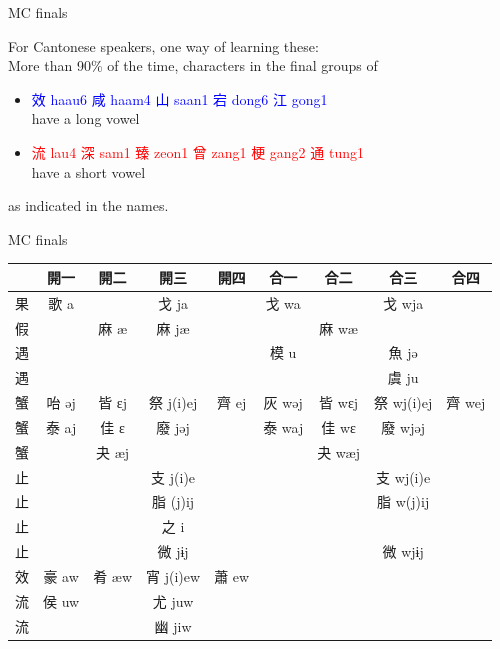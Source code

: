 \documentclass{beamer}
\begin{document}
\begin{frame}[fragile]{MC finals}

For Cantonese speakers, one way of learning these:\\
More than 90\% of the time, characters in the final groups of
        \begin{itemize}
            \item \textcolor{blue}{效 haau6 咸 haam4 山 saan1 宕 dong6 江 gong1}\\ have a long vowel
            \item \textcolor{red}{流 lau4 深 sam1 臻 zeon1 曾 zang1 梗 gang2 通 tung1}\\ have a short vowel
        \end{itemize}
as indicated in the names.\\

\end{frame}

\begin{frame}[fragile]{MC finals}

\begin{table}
    \centering
      {\scriptsize
        \setlength{\tabcolsep}{1pt}
        \renewcommand{\arraystretch}{1.2}    \begin{tabular}{c|c c c c|c c c c}
         & 開一 & 開二 & 開三 & 開四 & 合一 & 合二 & 合三 & 合四 \\ \hline
        果 & 歌 a & & 戈 ja & & 戈 wa & & 戈 wja & \\ \hline
        假 & & 麻 æ & 麻 jæ & & & 麻 wæ & & \\ \hline
        遇 & & & & & 模 u & & 魚 jə & \\
        遇 & & & & & & & 虞 ju & \\ \hline
        蟹 & 咍 əj & 皆 ɛj & 祭 j(i)ej & 齊 ej & 灰 wəj & 皆 wɛj & 祭 wj(i)ej & 齊 wej \\
        蟹 & 泰 aj & 佳 ɛ & 廢 jəj & & 泰 waj & 佳 wɛ & 廢 wjəj & \\
        蟹 & & 夬 æj & & & & 夬 wæj & & \\ \hline
        止 & & & 支 j(i)e & & & & 支 wj(i)e & \\
        止 & & & 脂 (j)ij & & & & 脂 w(j)ij & \\
        止 & & & 之 i & & & & & \\
        止 & & & 微 jɨj & & & & 微 wjɨj & \\ \hline
        效 & 豪 aw & 肴 æw & 宵 j(i)ew & 蕭 ew & & & & \\ \hline
        流 & 侯 uw & & 尤 juw & & & & & \\
        流 & & & 幽 jiw & & & & & \\  
    \end{tabular}}
\end{table}

\end{frame}
\end{document}

